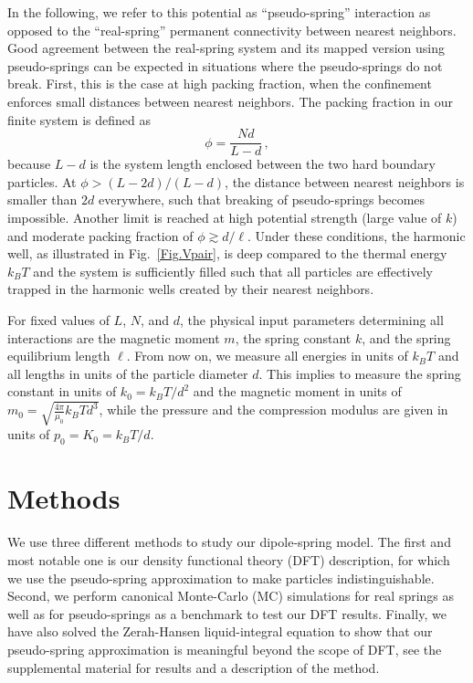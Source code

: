 \documentclass[aps,pre,twocolumn,superscriptaddress,nofootinbib]{revtex4}
\begin{document}
In the following, we refer to this potential as ``pseudo-spring'' interaction as opposed to the ``real-spring'' permanent connectivity between nearest neighbors.
Good agreement between the real-spring system and its mapped version using pseudo-springs can be expected in situations where the pseudo-springs do not break.
First, this is  the case at high packing fraction, when the confinement enforces small distances between nearest neighbors.
The packing fraction in our finite system is defined as
%
\begin{equation}
	\phi = \frac{N d}{L - d} \, ,
	\label{Eq.packing_fraction}
\end{equation}
%
because $L - d$ is the system length enclosed between the two hard boundary particles. 
At $\phi > (L-2d) / (L-d)$, the distance between nearest neighbors is smaller than $2d$ everywhere, such that breaking of pseudo-springs becomes impossible. 
Another limit is reached at high potential strength (large value of $k$) and moderate packing fraction of $\phi \gtrsim d / \ell$. 
Under these conditions, the harmonic well, as illustrated in Fig.~\ref{Fig.Vpair}, is deep compared to the thermal energy $k_BT$ and the system is sufficiently filled such that all particles are effectively trapped in the harmonic wells created by their nearest neighbors. 

For fixed values of $L$, $N$, and $d$, the physical input parameters determining all interactions are the magnetic moment $m$, the spring constant $k$, and the spring equilibrium length $\ell$. 
From now on, we measure all energies in units of $k_BT$ and all lengths in units of the particle diameter $d$. 
This implies to measure the spring constant in units of $k_0 = k_BT / d^2$ and the magnetic moment in units of $m_0 = \sqrt{\frac{4\pi}{\mu_0} k_BT d^3}$, while the
pressure and the compression modulus are given in units of $p_0 = K_0 = k_BT / d$.

\section{Methods}
\label{Sec.Methods}

We use three different methods to study our dipole-spring model. 
The first and most notable one is our density functional theory (DFT) description, for which we use the pseudo-spring approximation to make particles indistinguishable. 
Second, we perform canonical Monte-Carlo (MC) simulations for real springs as well as for pseudo-springs as a benchmark to test our DFT results. 
Finally, we have also solved the Zerah-Hansen liquid-integral equation to show that our pseudo-spring approximation is meaningful beyond the scope of DFT, see the supplemental material \cite{supplemental} for results and a description of the method.
\end{document}
